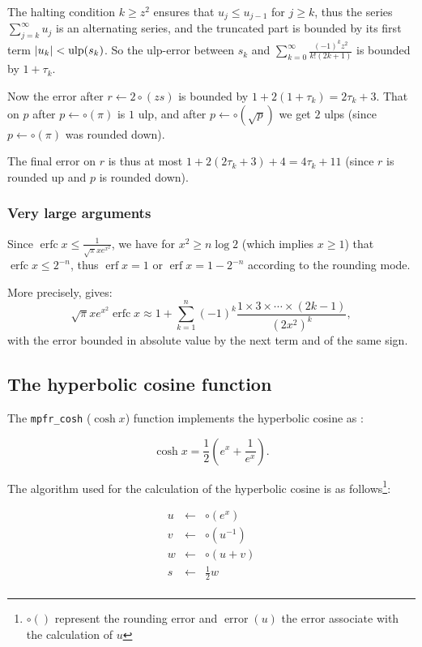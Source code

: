 \documentclass[12pt]{amsart}
\DeclareMathOperator{\erf}{erf}
\DeclareMathOperator{\erfc}{erfc}
\DeclareMathOperator{\error}{error}
\begin{document}
The halting condition $k \geq z^2$ ensures that $u_j \leq u_{j-1}$ for
$j \geq k$, thus the series $\sum_{j=k}^{\infty} u_j$ is an alternating series,
and the truncated part is bounded by its first term $|u_k| < {\rm ulp}(s_k)$.
So the ulp-error between $s_k$ and $\sum_{k=0}^{\infty} \frac{(-1)^k z^2}{k!
(2k+1)}$ is bounded by $1+\tau_k$.

Now the error after $r \leftarrow 2 \circ (z s)$ is bounded by
$1 + 2 (1+\tau_k) = 2 \tau_k + 3$.
That on $p$ after $p \leftarrow \circ (\pi)$ is $1$ ulp,
and after $p \leftarrow \circ (\sqrt{p})$ we get $2$ ulps
(since $p \leftarrow \circ (\pi)$ was rounded down).

The final error on $r$ is thus at most
$1 + 2 (2 \tau_k + 3) + 4 = 4 \tau_k + 11$
(since $r$ is rounded up and $p$ is rounded down).

\subsubsection{Very large arguments}

Since $\erfc x \leq \frac{1}{\sqrt{\pi} x e^{x^2}}$,
we have for $x^2 \geq n \log 2$ (which implies $x \geq 1$)
that $\erfc x \leq 2^{-n}$, thus
$\erf x = 1$ or $\erf x = 1 - 2^{-n}$ according to the rounding mode.

More precisely, \cite[formul{\ae} 7.1.23 and 7.1.24]{AbSt73} gives:
\[ \sqrt{\pi} x e^{x^2} \erfc x \approx
   1 + \sum_{k=1}^n (-1)^k \frac{1 \times 3 \times \cdots \times (2k-1)}
   {(2x^2)^k}, \]
with the error bounded in absolute value by the next term and of the same sign.

\subsection{The hyperbolic cosine function}

The {\tt mpfr\_cosh} ($\cosh{x}$) function implements the hyperbolic
cosine as :

\[\cosh x = \frac{1}{2} \left( e^{x} + \frac{1}{e^x} \right).\]

The algorithm used for the calculation of the hyperbolic cosine is as follows\footnote{$\circ()$ represent the rounding error and $\error(u)$ the
  error associate with the calculation of $u$}:

\begin{eqnarray}\nonumber
u&\leftarrow&\circ(e^x)\\\label{coshalgo1}
v&\leftarrow&\circ({u}^{-1})\\\label{coshalgo2}
w&\leftarrow&\circ(u+v)\\\label{coshalgo3}
s&\leftarrow&\frac{1}{2} w\\\label{coshalgo4}
\end{eqnarray}
\end{document}
